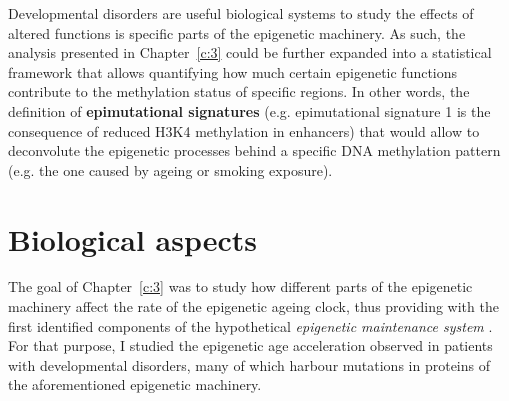 \bigskip

Developmental disorders are useful biological systems to study the effects of altered functions is specific parts of the epigenetic machinery. As such, the analysis presented in Chapter~\ref{c:3} could be further expanded into a statistical framework that allows quantifying how much certain epigenetic functions contribute to the methylation status of specific regions. In other words, the definition of \textbf{epimutational signatures} (e.g. epimutational signature 1 is the consequence of reduced H3K4 methylation in enhancers) that would allow to deconvolute the epigenetic processes behind a specific DNA methylation pattern (e.g. the one caused by ageing or smoking exposure).

\smallskip

\section{Biological aspects}

\smallskip

The goal of Chapter~\ref{c:3} was to study how different parts of the epigenetic machinery affect the rate of the epigenetic ageing clock, thus providing with the first identified components of the hypothetical \textit{epigenetic maintenance system} \cite{Horvath2013}. For that purpose, I studied the epigenetic age acceleration observed in patients with developmental disorders, many of which harbour mutations in proteins of the aforementioned epigenetic machinery.

\bigskip

